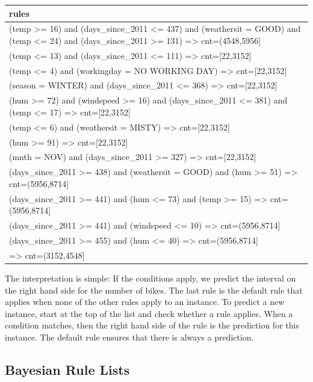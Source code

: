 \documentclass[
  11pt,
]{scrbook}
\begin{document}
\begin{table}
\centering
\begin{tabular}{>{\raggedright\arraybackslash}p{10cm}}
\toprule
rules\\
\midrule
(temp >= 16) and (days\_since\_2011 <= 437) and (weathersit = GOOD) and (temp <= 24) and (days\_since\_2011 >= 131) => cnt=(4548,5956]\\
(temp <= 13) and (days\_since\_2011 <= 111) => cnt=[22,3152]\\
(temp <= 4) and (workingday = NO WORKING DAY) => cnt=[22,3152]\\
(season = WINTER) and (days\_since\_2011 <= 368) => cnt=[22,3152]\\
(hum >= 72) and (windspeed >= 16) and (days\_since\_2011 <= 381) and (temp <= 17) => cnt=[22,3152]\\
\addlinespace
(temp <= 6) and (weathersit = MISTY) => cnt=[22,3152]\\
(hum >= 91) => cnt=[22,3152]\\
(mnth = NOV) and (days\_since\_2011 >= 327) => cnt=[22,3152]\\
(days\_since\_2011 >= 438) and (weathersit = GOOD) and (hum >= 51) => cnt=(5956,8714]\\
(days\_since\_2011 >= 441) and (hum <= 73) and (temp >= 15) => cnt=(5956,8714]\\
\addlinespace
(days\_since\_2011 >= 441) and (windspeed <= 10) => cnt=(5956,8714]\\
(days\_since\_2011 >= 455) and (hum <= 40) => cnt=(5956,8714]\\
=> cnt=(3152,4548]\\
\bottomrule
\end{tabular}
\end{table}

The interpretation is simple:
If the conditions apply, we predict the interval on the right hand side for the number of bikes.
The last rule is the default rule that applies when none of the other rules apply to an instance.
To predict a new instance, start at the top of the list and check whether a rule applies.
When a condition matches, then the right hand side of the rule is the prediction for this instance.
The default rule ensures that there is always a prediction.

\hypertarget{bayesian-rule-lists}{%
\subsection{Bayesian Rule Lists}\label{bayesian-rule-lists}}
\end{document}
